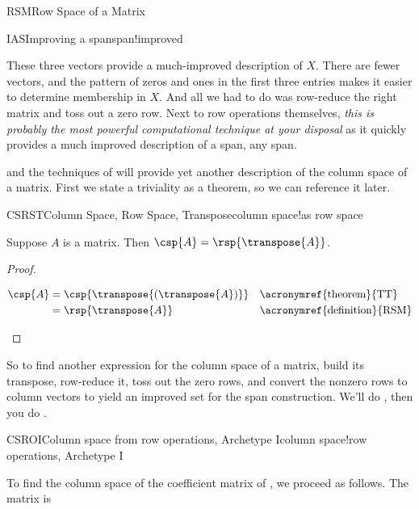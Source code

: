 \begin{subsect}{RSM}{Row Space of a Matrix}
\begin{example}{IAS}{Improving a span}{span!improved}
\begin{para}
\end{para}
%
\begin{para}These three vectors provide a much-improved description of $X$.  There are fewer vectors, and the pattern of zeros and ones in the first three entries makes it easier to determine membership in $X$.  And all we had to do was row-reduce the right matrix and toss out a zero row.  Next to row operations themselves, {\em this is probably the most powerful computational technique at your disposal} as it quickly provides a much improved description of a span, any span.\end{para}
%
\end{example}
%
\begin{para} and the techniques of  will provide yet another description of the column space of a matrix.  First we state a triviality as a theorem, so we can reference it later.\end{para}
%
\begin{theorem}{CSRST}{Column Space, Row Space, Transpose}{column space!as row space}
\begin{para}Suppose $A$ is a matrix.  Then $\csp{A}=\rsp{\transpose{A}}$.\end{para}
\end{theorem}
%
\begin{proof}
%
\begin{para}\begin{align*}
\csp{A}
&=\csp{\transpose{\left(\transpose{A}\right)}}
&&\text{\acronymref{theorem}{TT}}\\
%
&=\rsp{\transpose{A}}
&&\text{\acronymref{definition}{RSM}}
%
\end{align*}
\end{para}
%
\end{proof}
%
\begin{para}So to find another expression for the column space of a matrix, build its transpose, row-reduce it, toss out the zero rows, and convert the nonzero rows to column vectors to yield an improved set for the span construction.  We'll do , then you do .\end{para}
%
\begin{example}{CSROI}{Column space from row operations, Archetype I}{column space!row operations, Archetype I}
%
\begin{para}To find the column space of the coefficient matrix of , we proceed as follows.  The matrix is

\end{para}
\end{example}
\end{subsect}

